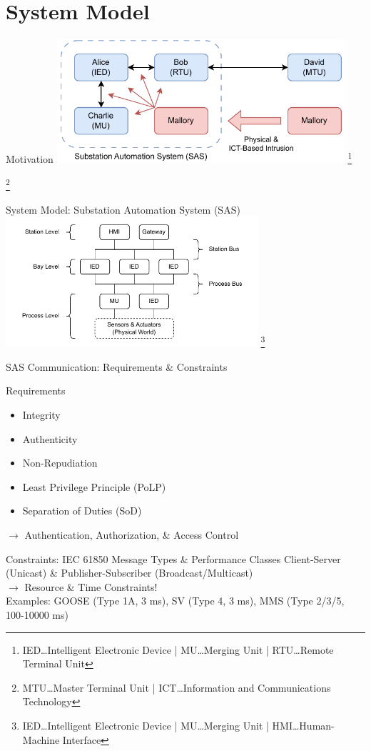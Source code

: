 \documentclass[en]{sdqbeamer}
\newcommand\nonumberfootnote[1]{%
  \begingroup
  \renewcommand\thefootnote{}\footnote{#1}%
  \addtocounter{footnote}{-1}%
  \endgroup
}
\begin{document}
\section{System Model}
\begin{frame}{Motivation}
    \centering
	\includegraphics[width=0.8\textwidth]{./figures/sas_intrusion.drawio.pdf}
    \nonumberfootnote{IED\dots Intelligent Electronic Device | MU\dots Merging Unit | RTU\dots Remote Terminal Unit}
    \nonumberfootnote{MTU\dots Master Terminal Unit | ICT\dots Information and Communications Technology}
\end{frame}
\begin{frame}{System Model: Substation Automation System (SAS)}
    \centering
    \includegraphics[width=0.7\textwidth]{./figures/substation_architecture.drawio.pdf}
    \nonumberfootnote{IED\dots Intelligent Electronic Device | MU\dots Merging Unit | HMI\dots Human-Machine Interface}
\end{frame}
\begin{frame}{SAS Communication: Requirements \& Constraints}
    \begin{blueblock}{Requirements}
        \begin{itemize}
            \item Integrity
            \item Authenticity
            \item Non-Repudiation
            \item Least Privilege Principle (PoLP)
            \item Separation of Duties (SoD)
        \end{itemize}
        $\rightarrow$ Authentication, Authorization, \& Access Control
    \end{blueblock}
    \begin{grayblock}{Constraints: IEC 61850 Message Types \& Performance Classes \parencite*{IEC61850P5,IEC61850P8}}
        Client-Server (Unicast) \& Publisher-Subscriber (Broadcast/Multicast) \\$\rightarrow$ Resource \& Time Constraints!
        \\Examples: GOOSE (Type 1A, 3 ms), SV (Type 4, 3 ms), MMS (Type 2/3/5, 100-10000 ms)
    \end{grayblock}
\end{frame}
\end{document}
